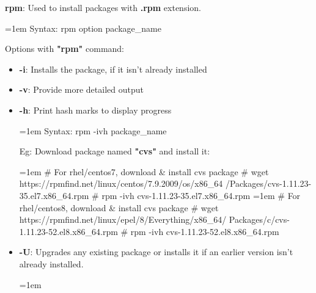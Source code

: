 \setlength{\columnsep}{3pt}
\begin{flushleft}
	\textbf{rpm}: Used to install packages with \textbf{.rpm} extension.
	\begin{tcolorbox}[breakable,notitle,boxrule=-0pt,colback=pink,colframe=pink]
		\color{black}
		\font=1em
		Syntax: rpm option package\_name
		\font=4pt
	\end{tcolorbox}

	Options with \textbf{"rpm"} command:
	\begin{itemize}
		\item \textbf{-i}: Installs the package, if it isn't already installed
		\item \textbf{-v}: Provide more detailed output
		\item \textbf{-h}: Print hash marks to display progress
		\begin{tcolorbox}[breakable,notitle,boxrule=-0pt,colback=pink,colframe=pink]
			\color{black}
			\font=1em
			Syntax: rpm -ivh package\_name
			\font=4pt
		\end{tcolorbox}
		Eg: Download package named \textbf{"cvs"} and install it:
		\bigskip
		\begin{tcolorbox}[breakable,notitle,boxrule=-0pt,colback=black,colframe=black]
			\color{yellow}
			\font=1em
			\# For rhel/centos7, download \& install cvs package
			\newline
			\color{green}
			\# wget https://rpmfind.net/linux/centos/7.9.2009/os/x86\_64
			/Packages/cvs-1.11.23-35.el7.x86\_64.rpm
			\newline
			\# rpm -ivh cvs-1.11.23-35.el7.x86\_64.rpm
			\newline
			\newline
			\color{yellow}
			\font=1em
			\# For rhel/centos8, download \& install cvs package
			\color{green}
			\newline
			\# wget https://rpmfind.net/linux/epel/8/Everything/x86\_64/
			Packages/c/cvs-1.11.23-52.el8.x86\_64.rpm
			\newline
			\# rpm -ivh cvs-1.11.23-52.el8.x86\_64.rpm 
			\font=4pt
		\end{tcolorbox}
		\bigskip
		\bigskip
		\item \textbf{-U}: Upgrades any existing package or installs it if an earlier version
		isn't already installed.
		\begin{tcolorbox}[breakable,notitle,boxrule=-0pt,colback=pink,colframe=pink]
			\color{black}
			\font=1em

\end{tcolorbox}
\end{itemize}
\end{flushleft}

